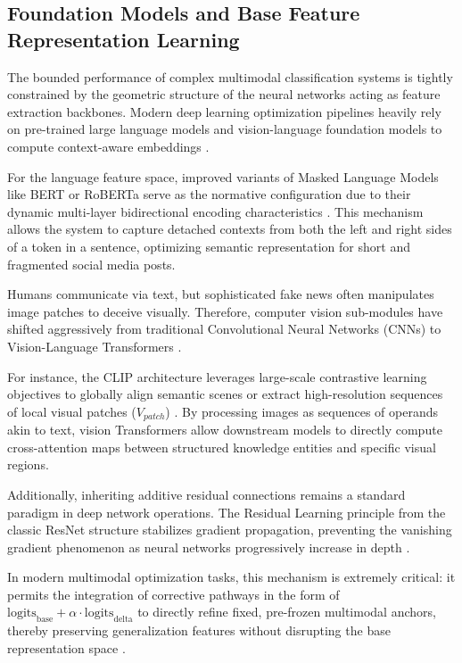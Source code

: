 \subsection{Foundation Models and Base Feature Representation Learning}
The bounded performance of complex multimodal classification systems is tightly constrained by the geometric structure of the neural networks acting as feature extraction backbones. Modern deep learning optimization pipelines heavily rely on pre-trained large language models and vision-language foundation models to compute context-aware embeddings \cite{ref27}.

For the language feature space, improved variants of Masked Language Models like BERT or RoBERTa serve as the normative configuration due to their dynamic multi-layer bidirectional encoding characteristics \cite{ref6, ref7}. This mechanism allows the system to capture detached contexts from both the left and right sides of a token in a sentence, optimizing semantic representation for short and fragmented social media posts.

Humans communicate via text, but sophisticated fake news often manipulates image patches to deceive visually. Therefore, computer vision sub-modules have shifted aggressively from traditional Convolutional Neural Networks (CNNs) to Vision-Language Transformers \cite{ref28, ref9}.

For instance, the CLIP architecture leverages large-scale contrastive learning objectives to globally align semantic scenes or extract high-resolution sequences of local visual patches ($V_{patch}$) \cite{ref28, ref9}. By processing images as sequences of operands akin to text, vision Transformers allow downstream models to directly compute cross-attention maps between structured knowledge entities and specific visual regions.

Additionally, inheriting additive residual connections remains a standard paradigm in deep network operations. The Residual Learning principle from the classic ResNet structure stabilizes gradient propagation, preventing the vanishing gradient phenomenon as neural networks progressively increase in depth \cite{ref8}.

In modern multimodal optimization tasks, this mechanism is extremely critical: it permits the integration of corrective pathways in the form of $\text{logits}_{\text{base}} + \alpha \cdot \text{logits}_{\text{delta}}$ to directly refine fixed, pre-frozen multimodal anchors, thereby preserving generalization features without disrupting the base representation space \cite{ref29}.

